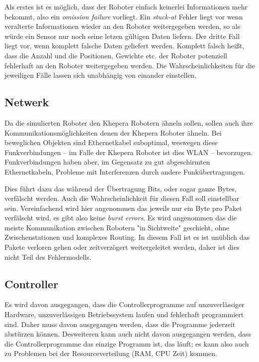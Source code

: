 Als erstes ist es m{\"{o}}glich, dass der Roboter einfach keinerlei Informationen mehr bekommt, also ein \textit{omission failure} vorliegt. Ein \textit{stuck-at} Fehler liegt
vor wenn veralterte Informationen wieder an den Roboter weitergegeben werden, so als w{\"{u}}rde ein Sensor nur noch seine letzen g{\"{u}}ltigen Daten liefern. Der dritte
Fall liegt vor, wenn komplett falsche Daten geliefert werden. Komplett falsch hei{\ss}t, dass die Anzahl und die Positionen, Gewichte etc. der Roboter potenziell fehlerhaft an
den Roboter weitergegeben werden. Die Wahrscheinlichkeiten f{\"{u}}r die jeweiligen F{\"{a}}lle lassen sich unabh{\"{a}}ngig von einander einstellen.

\subsection{Netwerk}
Da die simulierten Roboter den Khepera Robotern {\"{a}}hneln sollen, sollen auch ihre 
Kommunikationsm{\"{o}}glichkeiten denen der Khepera Roboter {\"{a}}hneln. Bei beweglichen
Objekten sind Ethernetkabel suboptimal, weswegen diese Funkverbindungen -- im Falle der Khepera
Roboter ist dies WLAN -- bevorzugen. Funkverbindungen haben aber, im Gegensatz zu gut abgeschirmten
Ethernetkabeln, Probleme mit Interferenzen durch andere Funk{\"{u}}bertragungen.

Dies f{\"{u}}hrt dazu das w{\"{a}}hrend der {\"{U}}bertragung Bits, oder sogar ganze Bytes, verf{\"{a}}lscht werden. Auch die Wahrscheinlichkeit f{\"{u}}r diesen Fall
soll einstellbar sein. Vereinfachend wird hier angenommen das jeweils nur ein Byte pro Paket verf{\"{a}}lscht wird, es gibt also keine \textit{burst errors}.
Es wird angenommen das die meiste Kommunikation zwischen Robotern "in Sichtweite" geschieht, ohne Zwischenstationen und komplexes Routing. In diesem Fall ist
es ist un{\"{u}}blich das Pakete verloren gehen oder zeitverz{\"{o}}gert weitergeleitet werden, daher ist dies nicht Teil des Fehlermodells.

\subsection{Controller}
Es wird davon ausgegangen, dass die Controllerprogramme auf unzuverl{\"{a}}ssiger Hardware, unzuverl{\"{a}}ssigen 
Betriebssystem laufen und fehlerhaft programmiert sind. Daher muss davon ausgegangen werden, dass die
Programme jederzeit abst{\"{u}}rzen k{\"{o}}nnen. Desweiteren kann auch nicht davon ausgegangen werden,
dass die Controllerprogramme das einzige Programm ist, das l{\"{a}}uft; es kann also auch zu Problemen bei
der Resourceverteilung (RAM, CPU Zeit) kommen.

